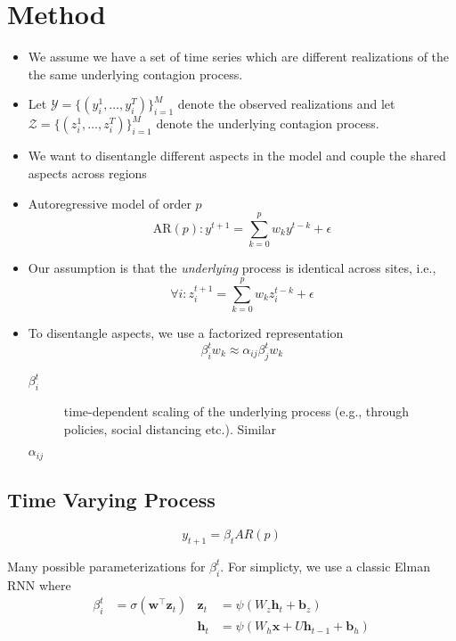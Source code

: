 \documentclass{article}
\renewcommand{\vec}[1]{\bm{#1}}
\newcommand{\Set}[1]{\mathcal{#1}}
\begin{document}
\section{Method}
\label{sec:org4028fe0}
\begin{itemize}
\item We assume we have a set of time series which are different realizations of the
the same underlying contagion process.
\item Let \(\Set{Y} = \{(y_i^1, \ldots, y_i^T)\}_{i=1}^M\) denote the observed
realizations and let \(\Set{Z} = \{(z_i^1, \ldots, z_i^T)\}_{i=1}^M\) denote the
underlying contagion process.
\item We want to disentangle different aspects in the model and couple the shared
aspects across regions
\item Autoregressive model of order \(p\)
\begin{equation}
  \text{AR}(p): y^{t+1} = \sum_{k=0}^p w_k y^{t-k} + \epsilon
\end{equation}
\item Our assumption is that the \emph{underlying} process is identical across sites,
i.e.,
\begin{equation}
  \forall i: z_i^{t+1} = \sum_{k=0}^p w_k z_i^{t-k} + \epsilon
\end{equation}
\item To disentangle aspects, we use a factorized representation
\begin{equation}
\beta_i^t w_k \approx \alpha_{ij }\beta_j^t w_k
\end{equation}

\begin{description}
\item[{\(\beta_i^t\)}] time-dependent scaling of the underlying process (e.g.,
through policies, social distancing etc.). Similar
\item[{\(\alpha_{ij}\)}] 
\end{description}
\end{itemize}

\subsection{Time Varying Process}
\label{sec:org2d4718a}
\begin{equation*}
    y_{t+1} = \beta_t AR(p)
\end{equation*}

Many possible parameterizations for \(\beta_i^t\). For simplicty, we use a classic Elman RNN
where
\begin{align*}
    \beta_i^t & = \sigma(\vec{w}^\top \vec{z}_t)
    & \vec{z}_t & = \psi(W_z\vec{h}_t + \vec{b}_z) \\
    && \vec{h}_t & = \psi(W_h\vec{x} + U\vec{h}_{t-1} + \vec{b}_h)
\end{align*}
\end{document}
